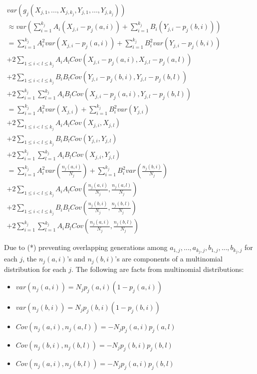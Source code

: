 \documentclass{article}
\begin{document}
$\displaystyle \begin{array}{l}
var( g_{j}( X_{j,1} ,...,X_{j,k_{j}} ,Y_{j,1} ,...,Y_{j,k_{j}}))\\
\approx var\left(\sum _{i=1}^{k_{j}} A_{i}( X_{j,i} -p_{j}( a,i)) +\sum _{i=1}^{k_{j}} B_{i}( Y_{j,i} -p_{j}( b,i))\right)\\
=\sum _{i=1}^{k_{j}} A_{i}^{2} var( X_{j,i} -p_{j}( a,i)) +\sum _{i=1}^{k_{j}} B_{i}^{2} var( Y_{j,i} -p_{j}( b,i))\\
+2\sum _{1\leqslant i< l\leqslant k_{j}} A_{i} A_{l} Cov( X_{j,i} -p_{j}( a,i) ,X_{j,l} -p_{j}( a,l))\\
+2\sum _{1\leqslant i< l\leqslant k_{j}} B_{i} B_{l} Cov( Y_{j,i} -p_{j}( b,i) ,Y_{j,l} -p_{j}( b,l))\\
+2\sum _{i=1}^{k_{j}}\sum _{l=1}^{k_{j}} A_{i} B_{l} Cov( X_{j,i} -p_{j}( a,i) ,Y_{j,l} -p_{j}( b,l))\\
=\sum _{i=1}^{k_{j}} A_{i}^{2} var( X_{j,i}) +\sum _{i=1}^{k_{j}} B_{i}^{2} var( Y_{j,i})\\
+2\sum _{1\leqslant i< l\leqslant k_{j}} A_{i} A_{l} Cov( X_{j,i} ,X_{j,l})\\
+2\sum _{1\leqslant i< l\leqslant k_{j}} B_{i} B_{l} Cov( Y_{j,i} ,Y_{j,l})\\
+2\sum _{i=1}^{k_{j}}\sum _{l=1}^{k_{j}} A_{i} B_{l} Cov( X_{j,i} ,Y_{j,l})\\
=\sum _{i=1}^{k_{j}} A_{i}^{2} var\left(\frac{n_{j}( a,i)}{N_{j}}\right) +\sum _{i=1}^{k_{j}} B_{i}^{2} var\left(\frac{n_{j}( b,i)}{N_{j}}\right)\\
+2\sum _{1\leqslant i< l\leqslant k_{j}} A_{i} A_{l} Cov\left(\frac{n_{j}( a,i)}{N_{j}} ,\frac{n_{j}( a,l)}{N_{j}}\right)\\
+2\sum _{1\leqslant i< l\leqslant k_{j}} B_{i} B_{l} Cov\left(\frac{n_{j}( b,i)}{N_{j}} ,\frac{n_{j}( b,l)}{N_{j}}\right)\\
+2\sum _{i=1}^{k_{j}}\sum _{l=1}^{k_{j}} A_{i} B_{l} Cov\left(\frac{n_{j}( a,i)}{N_{j}} ,\frac{n_{j}( b,l)}{N_{j}}\right)
\end{array}$

Due to (*) preventing overlapping generations among $\displaystyle a_{1,j} ,...,a_{k_{j} ,j} ,b_{1,j} ,...,b_{k_{j} ,j}$ for each $\displaystyle j$, the $\displaystyle n_{j}( a,i)$'s and $\displaystyle n_{j}( b,i)$'s are components of a multinomial distribution for each $\displaystyle j$. The following are facts from multinomial distributions:
\begin{itemize}
\item $\displaystyle var( n_{j}( a,i)) =N_{j} p_{j}( a,i)( 1-p_{j}( a,i))$
\item $\displaystyle var( n_{j}( b,i)) =N_{j} p_{j}( b,i)( 1-p_{j}( b,i))$
\item $\displaystyle Cov( n_{j}( a,i) ,n_{j}( a,l)) =-N_{j} p_{j}( a,i) p_{j}( a,l)$
\item $\displaystyle Cov( n_{j}( b,i) ,n_{j}( b,l)) =-N_{j} p_{j}( b,i) p_{j}( b,l)$
\item $\displaystyle Cov( n_{j}( a,i) ,n_{j}( b,l)) =-N_{j} p_{j}( a,i) p_{j}( b,l)$
\end{itemize}
\end{document}
